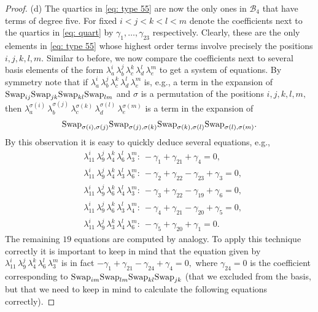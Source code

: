 \documentclass[12pt,dvipsnames,accepted=2016-08-18,a4paper,onecolumn]{quantumarticle}
\numberwithin{equation}{section}
\theoremstyle{definition}
\begin{document}
\begin{proof}
(d) The quartics in \eqref{eq: type 55} are now the only ones in $\mathcal{B}_4$ that have terms of degree five.
For fixed $i<j<k<l<m$ denote the coefficients next to the quartics in \eqref{eq: quart} by $\gamma_1,\ldots,\gamma_{23}$ respectively.
Clearly, these are the only elements in \eqref{eq: type 55} whose highest order terms involve precisely the positions $i,j,k,l,m.$ Similar to before, we now compare the coefficients next to several basis elements 
of the form $\lambda_a^i\, \lambda_b^j\, \lambda_c^k\, \lambda_d^l\, \lambda_e^m$ to get a system of equations. By symmetry note that  if  $\lambda_a^i\, \lambda_b^j\, \lambda_c^k\, \lambda_d^l\, \lambda_e^m$ is, e.g., a term in the expansion of $\textnormal{Swap}_{ij} \textnormal{Swap}_{jk} \textnormal{Swap}_{kl} \textnormal{Swap}_{lm}$ and $\sigma$ is a permutation of the positions $i,j,k,l,m,$ then $\lambda_a^{\sigma(i)}\, \lambda_b^{\sigma(j)}\, \lambda_c^{\sigma(k)}\, \lambda_d^{\sigma(l)}\, \lambda_e^{\sigma(m)}$ is a term in the expansion of $$\textnormal{Swap}_{\sigma(i),\sigma(j)} \textnormal{Swap}_{\sigma(j),\sigma(k)} \textnormal{Swap}_{\sigma(k),\sigma(l)} \textnormal{Swap}_{\sigma(l),\sigma(m)}.$$
By this observation it is easy to quickly deduce several equations, e.g.,
\begin{equation}\label{eq: t5-eq}
	\begin{split}
	&\lambda_{11}^i\, \lambda_9^j\, \lambda_4^k\, \lambda_6^l\, \lambda_3^m: \ 
	-\gamma_1 + \gamma_{21}+\gamma_4 = 0,\\
	&\lambda_{11}^i\, \lambda_9^j\, \lambda_4^k\, \lambda_3^l\, \lambda_6^m: \ 
	-\gamma_2 + \gamma_{22} - \gamma_{23} +\gamma_3 = 0,\\
	&\lambda_{11}^i\, \lambda_9^j\, \lambda_6^k\, \lambda_4^l\, \lambda_3^m: \ 
	-\gamma_3 + \gamma_{22} - \gamma_{19} +\gamma_6 = 0,\\
	&\lambda_{11}^i\, \lambda_9^j\, \lambda_6^k\, \lambda_3^l\, \lambda_4^m: \ 
	-\gamma_4 + \gamma_{21} - \gamma_{20} +\gamma_5 = 0,\\
	&\lambda_{11}^i\, \lambda_9^j\, \lambda_3^k\, \lambda_4^l\, \lambda_6^m: \ 
	-\gamma_5 + \gamma_{20} +\gamma_1 = 0.
	\end{split}
\end{equation}
    The remaining $19$ equations are computed by analogy.
	To apply this technique correctly it is important to keep in mind that  the equation given by $\lambda_{11}^i\, \lambda_9^j\, \lambda_4^k\, \lambda_6^l\, \lambda_3^m$ is in fact $-\gamma_1 + \gamma_{21} - \gamma_{24} +\gamma_4 = 0,$ where $\gamma_{24} = 0$ is the coefficient corresponding to $\textnormal{Swap}_{im} \textnormal{Swap}_{lm} \textnormal{Swap}_{kl} \textnormal{Swap}_{jk}$ (that we excluded from the basis, but that we need to keep in mind to calculate the following equations correctly). 

\end{proof}
\end{document}
